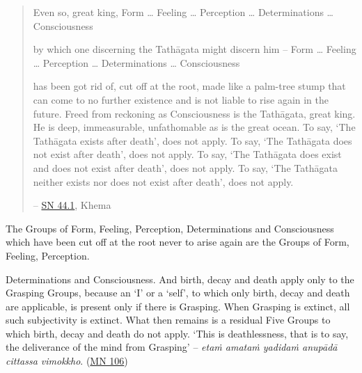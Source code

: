 \begin{quote}
Even so, great king,
 Form \ldots{}
 Feeling \ldots{}
 Perception \ldots{}
 Determinations \ldots{}
 Consciousness

by which one discerning the Tathāgata might discern him -- 
 Form \ldots{}
 Feeling \ldots{}
 Perception \ldots{}
 Determinations \ldots{}
 Consciousness

has been got rid of, cut off at the root, made like a palm-tree stump that can come to no further existence and is not liable to rise again in the future. Freed from reckoning as Consciousness is the Tathāgata, great king. He is deep, immeasurable, unfathomable as is the great ocean. To say, `The Tathāgata exists after death', does not apply. To say, `The Tathāgata does not exist after death', does not apply. To say, `The Tathāgata does exist and does not exist after death', does not apply. To say, `The Tathāgata neither exists nor does not exist after death', does not apply.

 -- \href{https://suttacentral.net/sn44.1/en/bodhi}{SN 44.1}, Khema
\end{quote}

The Groups of Form, Feeling, Perception, Determinations and Consciousness which have been cut off at the root never to arise again are the  Groups of Form, Feeling, Perception.

Determinations and Consciousness. And birth, decay and death apply only to the Grasping Groups, because an `I' or a `self', to which only birth, decay and death are applicable, is present only if there is Grasping. When Grasping is extinct, all such subjectivity is extinct. What then remains is a residual  Five Groups to which birth, decay and death do not apply. `This is deathlessness, that is to say, the deliverance of the mind from Grasping' -- \emph{etaṁ amataṁ yadidaṁ anupādā cittassa vimokkho}. (\href{https://suttacentral.net/mn106/en/sujato}{MN 106})

